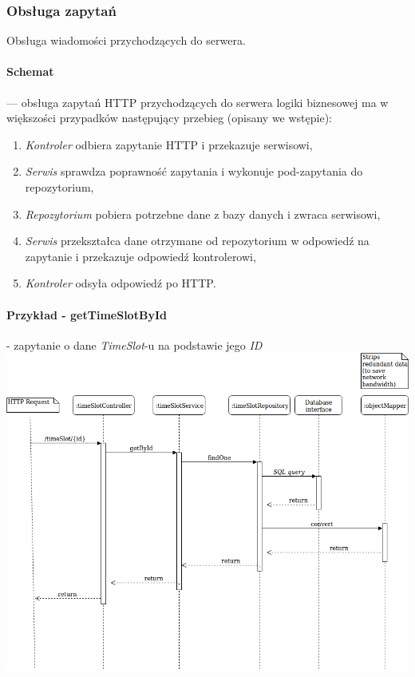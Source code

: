 \documentclass[polish,12pt]{aghthesis}
\begin{document}
\subsubsection{Obsługa zapytań}
Obsługa wiadomości przychodzących do serwera.
\paragraph{Schemat} --- 
obsługa zapytań HTTP przychodzących do serwera logiki biznesowej ma w większości przypadków następujący przebieg (opisany we wstępie):
\begin{enumerate}
  \item \emph{Kontroler} odbiera zapytanie HTTP i przekazuje serwisowi,
  \item \emph{Serwis} sprawdza poprawność zapytania i wykonuje pod-zapytania do repozytorium,
  \item \emph{Repozytorium} pobiera potrzebne dane z bazy danych i zwraca serwisowi,
  \item \emph{Serwis} przekształca dane otrzymane od repozytorium w odpowiedź na zapytanie i przekazuje odpowiedź kontrolerowi,
  \item \emph{Kontroler} odsyła odpowiedź po HTTP.
\end{enumerate}

\paragraph{Przykład - getTimeSlotById} - zapytanie o dane \emph{TimeSlot}-u na podstawie jego \emph{ID}
\includegraphics[width=\textwidth]{timeSlotById}
\end{document}
